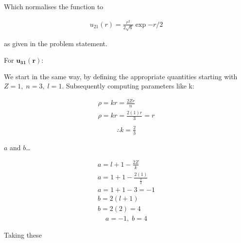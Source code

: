 \documentclass{article}
\begin{document}
    

    Which normalises the function to

    \begin{gather}
        u_{21}(r) = \frac{r^2}{2\sqrt{6}}\exp{-r/2}
    \end{gather}

    as given in the problem statement.

    \medskip

    For $\mathbf{u_{31}(r)}$:

    We start in the same way, by defining the appropriate quantities starting with $Z=1,\; n=3, \; l=1$.
    Subsequently computing parameters like k:

    \begin{gather*}
        \rho = kr = \frac{2Zr}{n}\\
        \rho = kr = \frac{2(1)r}{3} = r\\
    \end{gather*}\vspace{-1.5cm}
    \begin{gather}
        \therefore k = \frac{2}{3}
    \end{gather}

    $a$ and $b$\dots

    \begin{gather*} 
        a = l + 1 - \frac{2Z}{k}\\
        a = 1 + 1 - \frac{2(1)}{\frac{2}{3}}\\
        a = 1 + 1 - 3 = -1\\
        b = 2(l+1)\\
        b= 2(2) = 4
    \end{gather*}\vspace{-0.5cm}
    \begin{gather}
    a = -1, \; b= 4
    \end{gather}

    Taking these  
\end{document}

